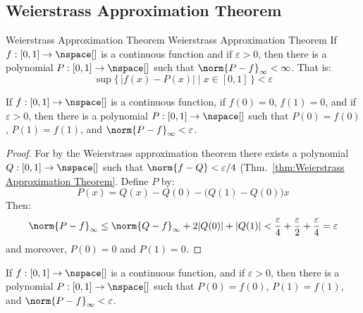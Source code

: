 \documentclass{article}                                                        %
\begin{document}
        \subsection{Weierstrass Approximation Theorem}
            \begin{ftheorem}{Weierstrass Approximation Theorem}
                            {Weierstrass Approximation Theorem}
                If $f:[0,1]\rightarrow\nspace[]$ is a continuous function and if
                $\varepsilon>0$, then there is a polynomial
                $P:[0,1]\rightarrow\nspace[]$ such that
                $\norm{P-f}_{\infty}<\infty$. That is:
                \begin{equation*}
                    \sup\big\{\,|f(x)-P(x)|\;\big|\;x\in[0,1]\,\big\}<\varepsilon
                \end{equation*}
            \end{ftheorem}
            \begin{theorem}
                \label{thm:Weierstrass_Approx_Endpoints_Eq_Zero}%
                If $f:[0,1]\rightarrow\nspace[]$ is a continuous function, if
                $f(0)=0$, $f(1)=0$, and if $\varepsilon>0$, then there is a
                polynomial $P:[0,1]\rightarrow\nspace[]$ such that $P(0)=f(0)$,
                $P(1)=f(1)$, and $\norm{P-f}_{\infty}<\varepsilon$.
            \end{theorem}
            \begin{proof}
                For by the Weierstrass approximation theorem there exists a
                polynomial $Q:[0,1]\rightarrow\nspace[]$ such that
                $\norm{f-Q}<\varepsilon/4$
                (Thm.~\ref{thm:Weierstrass Approximation Theorem}. Define $P$ by:
                \begin{equation}
                    P(x)=Q(x)-Q(0)-\big(Q(1)-Q(0)\big)x
                \end{equation}
                Then:
                \begin{equation}
                    \norm{P-f}_{\infty}\leq
                    \norm{Q-f}_{\infty}+2|Q(0)|+|Q(1)|
                    <\frac{\varepsilon}{4}+\frac{\varepsilon}{2}
                        +\frac{\varepsilon}{4}=\varepsilon
                \end{equation}
                and moreover, $P(0)=0$ and $P(1)=0$.
            \end{proof}
            \begin{theorem}
                \label{thm:Weierstrass_Fixed_Endpoints}%
                If $f:[0,1]\rightarrow\nspace[]$ is a continuous function, and if
                $\varepsilon>0$, then there is a polynomial
                $P:[0,1]\rightarrow\nspace[]$ such that $P(0)=f(0)$, $P(1)=f(1)$,
                and $\norm{P-f}_{\infty}<\varepsilon$.
            \end{theorem}
\end{document}
